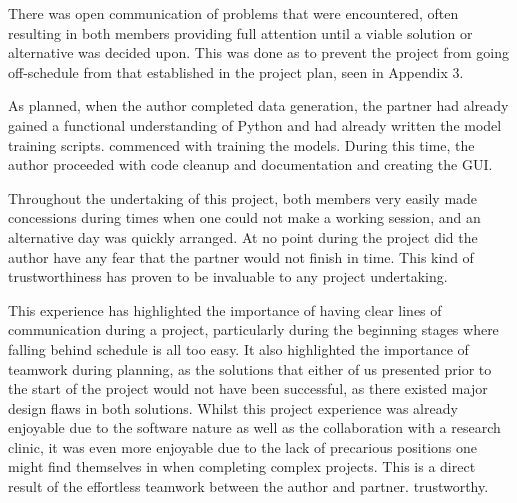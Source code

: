 \documentclass[conference]{IEEEtran}
\begin{document}
There was open communication of problems that were encountered, often resulting in both members providing full attention until a viable solution or alternative was decided upon.
This was done as to prevent the project from going off-schedule from that established in the project plan, seen in Appendix 3.

As planned, when the author completed data generation, the partner had already gained a functional understanding of Python and had already written the model training scripts. commenced with training the models.
During this time, the author proceeded with code cleanup and documentation and creating the GUI.

Throughout the undertaking of this project, both members very easily made concessions during times when one could not make a working session, and an alternative day was quickly arranged.
At no point during the project did the author have any fear that the partner would not finish in time.
This kind of trustworthiness has proven to be invaluable to any project undertaking.

This experience has highlighted the importance of having clear lines of communication during a project, particularly during the beginning stages where falling behind schedule is all too easy.
It also highlighted the importance of teamwork during planning, as the solutions that either of us presented prior to the start of the project would not have been successful, as there existed major design flaws in both solutions.
Whilst this project experience was already enjoyable due to the software nature as well as the collaboration with a research clinic, it was even more enjoyable due to the lack of precarious positions one might find themselves in when completing complex projects.
This is a direct result of the effortless teamwork between the author and partner. trustworthy.
\end{document}
